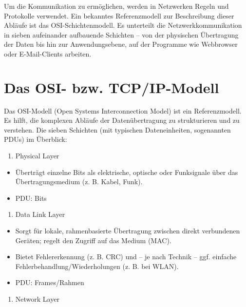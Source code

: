 \documentclass[
  nswissgerman,
  a4paper,
  DIV=11,
  numbers=noendperiod,
  ngerman]{scrreprt}
\providecommand{\tightlist}{%
  \setlength{\itemsep}{0pt}\setlength{\parskip}{0pt}}
\begin{document}
Um die Kommunikation zu ermöglichen, werden in Netzwerken Regeln und
Protokolle verwendet. Ein bekanntes Referenzmodell zur Beschreibung
dieser Abläufe ist das OSI-Schichtenmodell. Es unterteilt die
Netzwerkkommunikation in sieben aufeinander aufbauende Schichten -- von
der physischen Übertragung der Daten bis hin zur Anwendungsebene, auf
der Programme wie Webbrowser oder E-Mail-Clients arbeiten.

\section{Das OSI- bzw. TCP/IP-Modell}\label{das-osi--bzw.-tcpip-modell}

Das OSI-Modell (Open Systems Interconnection Model) ist ein
Referenzmodell. Es hilft, die komplexen Abläufe der Datenübertragung zu
strukturieren und zu verstehen. Die sieben Schichten (mit typischen
Dateneinheiten, sogenannten PDUs) im Überblick:

\begin{enumerate}
\def\labelenumi{\arabic{enumi})}
\tightlist
\item
  Physical Layer
\end{enumerate}

\begin{itemize}
\tightlist
\item
  Überträgt einzelne Bits als elektrische, optische oder Funksignale
  über das Übertragungsmedium (z. B. Kabel, Funk).
\item
  PDU: Bits
\end{itemize}

\begin{enumerate}
\def\labelenumi{\arabic{enumi})}
\setcounter{enumi}{1}
\tightlist
\item
  Data Link Layer
\end{enumerate}

\begin{itemize}
\tightlist
\item
  Sorgt für lokale, rahmenbasierte Übertragung zwischen direkt
  verbundenen Geräten; regelt den Zugriff auf das Medium (MAC).
\item
  Bietet Fehlererkennung (z. B. CRC) und -- je nach Technik -- ggf.
  einfache Fehlerbehandlung/Wiederholungen (z. B. bei WLAN).
\item
  PDU: Frames/Rahmen
\end{itemize}

\begin{enumerate}
\def\labelenumi{\arabic{enumi})}
\setcounter{enumi}{2}
\tightlist
\item
  Network Layer
\end{enumerate}
\end{document}
